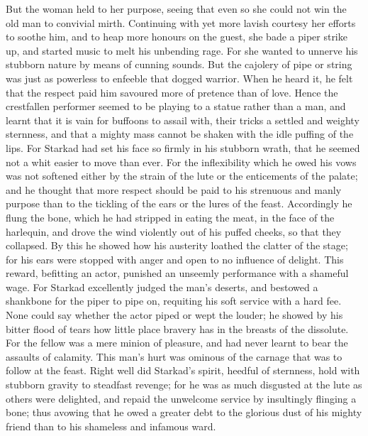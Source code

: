 \documentclass[10pt,a4paper]{report}
\begin{document}
But the woman held to her purpose, seeing that even so she could not win the old man to convivial mirth. Continuing with yet more lavish courtesy her efforts to soothe him, and to heap more honours on the guest, she bade a piper strike up, and started music to melt his unbending rage. For she wanted to unnerve his stubborn nature by means of cunning sounds. But the cajolery of pipe or string was just as powerless to enfeeble that dogged warrior. When he heard it, he felt that the respect paid him savoured more of pretence than of love. Hence the crestfallen performer seemed to be playing to a statue rather than a man, and learnt that it is vain for buffoons to assail with, their tricks a settled and weighty sternness, and that a mighty mass cannot be shaken with the idle puffing of the lips. For Starkad had set his face so firmly in his stubborn wrath, that he seemed not a whit easier to move than ever. For the inflexibility which he owed his vows was not softened either by the strain of the lute or the enticements of the palate; and he thought that more respect should be paid to his strenuous and manly purpose than to the tickling of the ears or the lures of the feast. Accordingly he flung the bone, which he had stripped in eating the meat, in the face of the harlequin, and drove the wind violently out of his puffed cheeks, so that they collapsed. By this he showed how his austerity loathed the clatter of the stage; for his ears were stopped with anger and open to no influence of delight. This reward, befitting an actor, punished an unseemly performance with a shameful wage. For Starkad excellently judged the man's deserts, and bestowed a shankbone for the piper to pipe on, requiting his soft service with a hard fee. None could say whether the actor piped or wept the louder; he showed by his bitter flood of tears how little place bravery has in the breasts of the dissolute. For the fellow was a mere minion of pleasure, and had never learnt to bear the assaults of calamity. This man's hurt was ominous of the carnage that was to follow at the feast. Right well did Starkad's spirit, heedful of sternness, hold with stubborn gravity to steadfast revenge; for he was as much disgusted at the lute as others were delighted, and repaid the unwelcome service by insultingly flinging a bone; thus avowing that he owed a greater debt to the glorious dust of his mighty friend than to his shameless and infamous ward.\\
\end{document}
